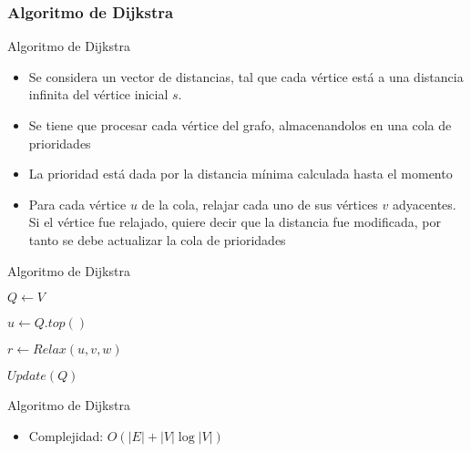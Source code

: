 \documentclass[handout]{beamer}
\begin{document}
\subsubsection{Algoritmo de Dijkstra}
\begin{frame}{Algoritmo de Dijkstra}
  \begin{itemize}
    \item Se considera un vector de distancias, tal que cada v\'ertice est\'a a una distancia infinita del v\'ertice inicial $s$.
      \pause
    \item Se tiene que procesar cada v\'ertice del grafo, almacenandolos en una cola de prioridades
      \pause
    \item La prioridad est\'a dada por la distancia m\'inima calculada hasta el momento
      \pause
    \item Para cada v\'ertice $u$ de la cola, relajar cada uno de sus v\'ertices $v$ adyacentes. Si el v\'ertice fue relajado, quiere decir que la distancia fue modificada, por tanto se debe actualizar la cola de prioridades
  \end{itemize}
\end{frame}

\begin{frame}{Algoritmo de Dijkstra}
  \begin{algorithm}[H]
    \BlankLine
    $Q \leftarrow V$ 
    {
      $u \leftarrow Q.top()$

      {
        $ r \leftarrow Relax(u, v, w) $

        {
          $Update(Q)$
        }
      }
    }

  \end{algorithm}
\end{frame}

\begin{frame}{Algoritmo de Dijkstra}
  \begin{itemize}
    \item Complejidad: $O(|E| + |V| \log |V|)$
  \end{itemize}
\end{frame}
\end{document}
